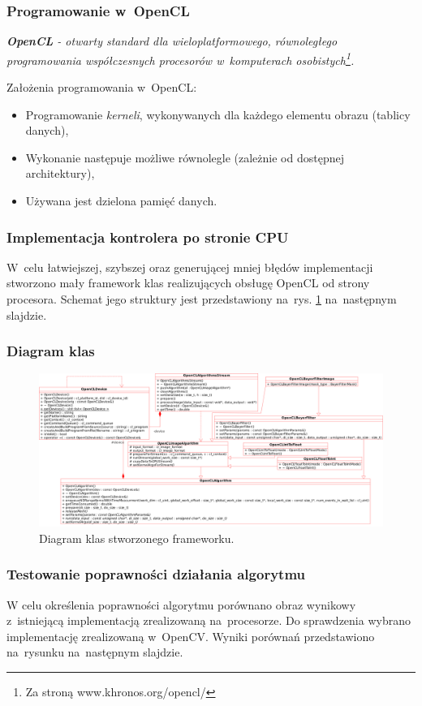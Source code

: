 \documentclass{beamer}
\begin{document}
\begin{frame}
	\frametitle{Programowanie w~OpenCL}
	
	\emph{\textbf{OpenCL} - otwarty standard dla wieloplatformowego, równoległego programowania współczesnych procesorów w~komputerach osobistych\footnote{Za stroną www.khronos.org/opencl/}.}
	
	\vspace{1em}
	
	Założenia programowania w~OpenCL:
	
	\begin{itemize}
	\item Programowanie \emph{kerneli}, wykonywanych dla każdego elementu obrazu (tablicy danych),
	\item Wykonanie następuje możliwe równolegle (zależnie od dostępnej architektury),
	\item Używana jest dzielona pamięć danych.
  \end{itemize}
\end{frame}

\begin{frame}
  \frametitle{Implementacja kontrolera po stronie CPU}
  W~celu łatwiejszej, szybszej oraz generującej mniej błędów implementacji stworzono mały framework klas realizujących obsługę OpenCL od strony procesora.
Schemat jego struktury jest przedstawiony na~rys. \ref{fig:class_diagram} na~następnym slajdzie.
\end{frame}

\begin{frame}
  \frametitle{Diagram klas}
\begin{figure}
  \centering
  \includegraphics[width=0.9\linewidth]{class_diagram}
  \caption{Diagram klas stworzonego frameworku.}
  \label{fig:class_diagram}
\end{figure}
  
\end{frame}

\begin{frame}
  \frametitle{Testowanie poprawności działania algorytmu}

W celu określenia poprawności algorytmu porównano obraz wynikowy z~istniejącą implementacją zrealizowaną na~procesorze. Do sprawdzenia wybrano implementację zrealizowaną w~OpenCV. Wyniki porównań przedstawiono na~rysunku na~następnym slajdzie.

\end{frame}
\end{document}
